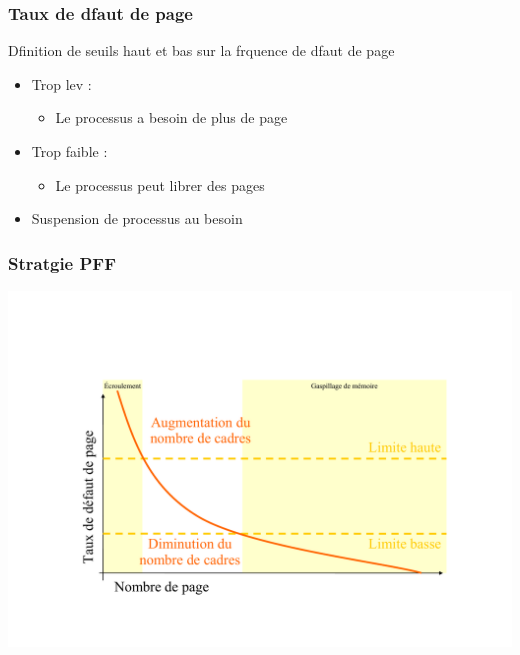 \begin{frame}
\frametitle{Taux de dfaut de page}
\item Dfinition de seuils haut et bas sur la frquence de dfaut de page
\begin{itemize}
\item Trop lev :
\begin{itemize}
\item Le processus a besoin de plus de page
\end{itemize}
\item Trop faible :
\begin{itemize}
\item Le processus peut librer des pages
\end{itemize}
\item Suspension de processus au besoin
\end{itemize}
\end{frame}


\begin{frame}
\frametitle{Stratgie PFF}
\includegraphics[width=.8\textwidth]{../illustration/Strategie_PFF.pdf}
\end{frame}



